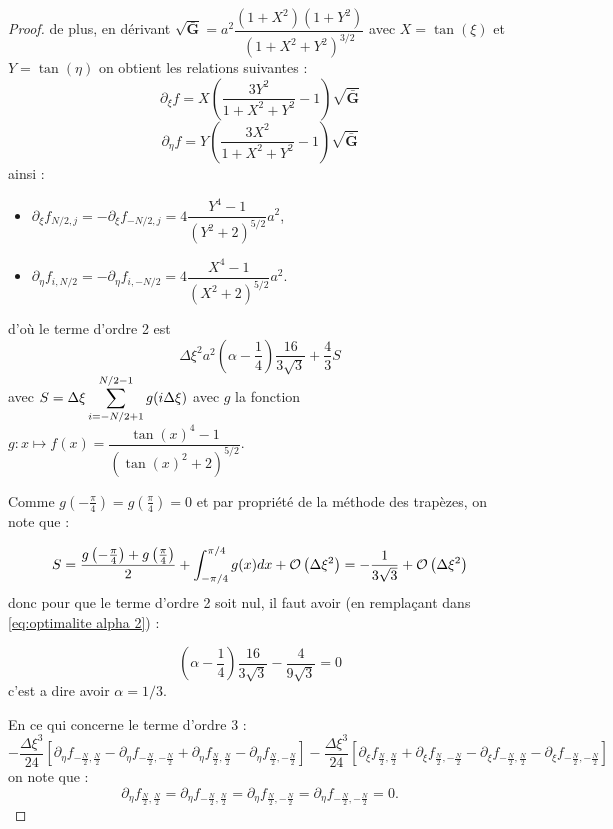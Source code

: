 \begin{proof}
de plus, en dérivant $\sqrt{\bar{\mathbf{G}}} = a^2 \dfrac{(1+X^2)(1+Y^2)}{(1+X^2+Y^2)^{3/2}}$ avec $X=\tan (\xi)$ et $Y=\tan (\eta)$ on obtient les relations suivantes :
\begin{equation}
\partial_{\xi} f = X \left(\dfrac{3Y^2}{1+X^2+Y^2}-1\right) \sqrt{\bar{\mathbf{G}}}
\end{equation}
\begin{equation}
\partial_{\eta} f = Y \left(\dfrac{3X^2}{1+X^2+Y^2}-1\right) \sqrt{\bar{\mathbf{G}}}
\end{equation}
ainsi :
\begin{itemize}
\item $\partial_{\xi} f_{N/2,j} = -\partial_{\xi} f_{-N/2,j} = 4 \dfrac{Y^4-1}{(Y^2+2)^{5/2}} a^2$,
\item $\partial_{\eta} f_{i,N/2} = -\partial_{\eta} f_{i,-N/2} = 4 \dfrac{X^4-1}{(X^2+2)^{5/2}} a^2$.
\end{itemize}
d'où le terme d'ordre 2 est
\begin{equation}
\Delta \xi^2 a^2 \left( \alpha - \dfrac{1}{4} \right) \dfrac{16}{3 \sqrt{3}} + \dfrac{4}{3}S
\label{eq:optimalite alpha 2}
\end{equation}
avec $S=\Delta \xi \displaystyle\sum\limits_{i=-N/2+1}^{N/2-1} g(i \Delta \xi)$ avec $g$ la fonction $g:x \mapsto f(x)=\dfrac{\tan(x)^4 -1}{(\tan(x)^2+2)^{5/2}}$.

Comme $g\left(-\frac{\pi}{4} \right)=g\left(\frac{\pi}{4} \right)=0$ et par propriété de la méthode des trapèzes, on note que :

\begin{equation}
S = \dfrac{g\left(-\frac{\pi}{4} \right)+g\left(\frac{\pi}{4} \right)}{2} + \displaystyle\int_{-\pi/4}^{\pi/4} g(x)dx + \mathcal{O}\left( \Delta \xi^2 \right) = -\dfrac{1}{3\sqrt{3}} + \mathcal{O}\left( \Delta \xi^2 \right)
\end{equation}
donc pour que le terme d'ordre 2 soit nul, il faut avoir (en remplaçant dans  \eqref{eq:optimalite alpha 2}) :

\begin{equation}
\left(\alpha - \dfrac{1}{4} \right) \dfrac{16}{3 \sqrt{3}} - \dfrac{4}{9 \sqrt{3}} = 0
\end{equation}
c'est a dire avoir $\alpha = 1/3$.

En ce qui concerne le terme d'ordre 3 :
\begin{equation}
- \dfrac{\Delta \xi^3}{24} \left[ \partial_{\eta} f_{-\frac{N}{2},\frac{N}{2}} - \partial_{\eta} f_{-\frac{N}{2},-\frac{N}{2}} + \partial_{\eta} f_{\frac{N}{2},\frac{N}{2}} -\partial_{\eta} f_{\frac{N}{2},-\frac{N}{2}}  \right] -\dfrac{\Delta \xi^3}{24} \left[ \partial_{\xi} f_{\frac{N}{2},\frac{N}{2}} + \partial_{\xi} f_{\frac{N}{2},-\frac{N}{2}} - \partial_{\xi} f_{-\frac{N}{2},\frac{N}{2}} -\partial_{\xi} f_{-\frac{N}{2},-\frac{N}{2}}  \right]
\label{eq:opimalite alpha 3}
\end{equation}
on note que :
\begin{equation}
\partial_{\eta} f_{\frac{N}{2},\frac{N}{2}} = \partial_{\eta} f_{-\frac{N}{2},\frac{N}{2}} = \partial_{\eta} f_{\frac{N}{2},-\frac{N}{2}} = \partial_{\eta} f_{-\frac{N}{2},-\frac{N}{2}} = 0.
\end{equation}


\end{proof}
